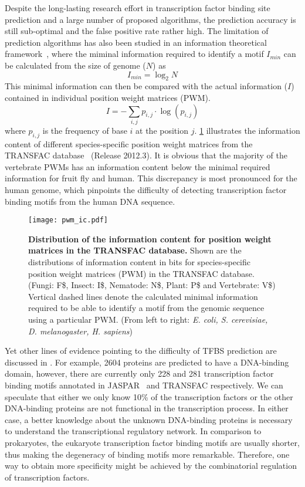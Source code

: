 Despite the long-lasting research effort in transcription factor binding site
prediction and a large number of proposed algorithms, the prediction accuracy 
is still sub-optimal and the false positive rate rather high. The limitation of
prediction algorithms has also been studied in an information theoretical
framework~\citep{Wunderlich2009}, where the miminal information required to identify a motif $I_{min}$ can be calculated from the size of genome ($N$) as
\begin{equation}
I_{min}=\log_2 N
\end{equation}
This minimal information can then be compared with the actual information ($I$) 
contained in individual position weight matrices (PWM).
\begin{equation}
\displaystyle I = -\sum_{i,j}p_{i,j} \cdot \log(p_{i,j})
\end{equation}
where $p_{i,j}$ is the frequency of base $i$ at the position $j$. \ref{fig:pwm_ic}
illustrates the information content of different species-specific position 
weight matrices from the TRANSFAC database~\citep{Matys2003b} (Release 2012.3). 
It is obvious that
the majority of the vertebrate PWMs has an information content below the 
minimal required information for fruit fly and human. This discrepancy is most
pronounced for the human genome, which pinpoints the difficulty of detecting 
transcription factor binding motifs from the human DNA sequence.

\begin{figure}[!ht]
\begin{center}
\texttt{[image: pwm\_ic.pdf]}
\end{center}
\caption[Information content of position weight matrices]{
{\bf Distribution of the information content for position weight matrices in 
the TRANSFAC database.}
Shown are the distributions of information content in bits for species-specific
position weight matrices (PWM) in the TRANSFAC database. (Fungi: F\$, Insect: I\$,
Nematode: N\$, Plant: P\$ and Vertebrate: V\$) Vertical dashed lines denote
the calculated minimal information required to be able to identify a motif from
the genomic sequence using a particular PWM. (From left to right: \emph{E. coli, 
S. cerevisiae, D. melanogaster, H. sapiens})
}
\label{fig:pwm_ic}
\end{figure}

Yet other lines of evidence pointing to the difficulty of TFBS prediction are
discussed in \cite{Babu2004}. For example, 2604 proteins are predicted to
have a DNA-binding domain, however, there are currently only 228 and 281 
transcription
factor binding motifs annotated in JASPAR~\citep{Sandelin2004} and TRANSFAC 
respectively. We can speculate that either we only know 10\% of the transcription
factors or the other DNA-binding proteins are not functional in the transcription
process. In either case, a better knowledge about the unknown DNA-binding
proteins is necessary to understand the transcriptional regulatory network.
In comparison to prokaryotes, the eukaryote transcription factor binding motifs 
are usually shorter, thus making the degeneracy of binding motifs more remarkable.
Therefore, one way to obtain more specificity might be achieved by the 
combinatorial regulation of transcription factors.
